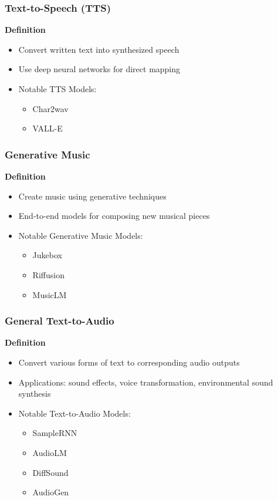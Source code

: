 \begin{frame}
    \frametitle{Text-to-Speech (TTS)}

    \textbf{Definition}
    \begin{itemize}
        \item Convert written text into synthesized speech
        \item Use deep neural networks for direct mapping
        \item Notable TTS Models:
              \begin{itemize}
                  \item Char2wav
                  \item VALL-E
              \end{itemize}
    \end{itemize}
\end{frame}

\begin{frame}
    \frametitle{Generative Music}

    \textbf{Definition}
    \begin{itemize}
        \item Create music using generative techniques
        \item End-to-end models for composing new musical pieces
        \item Notable Generative Music Models:
              \begin{itemize}
                  \item Jukebox
                  \item Riffusion
                  \item MusicLM
              \end{itemize}
    \end{itemize}

\end{frame}

\begin{frame}
    \frametitle{General Text-to-Audio}

    \textbf{Definition}
    \begin{itemize}
        \item Convert various forms of text to corresponding audio outputs
        \item Applications: sound effects, voice transformation, environmental sound synthesis
        \item Notable Text-to-Audio Models:
              \begin{itemize}
                  \item SampleRNN
                  \item AudioLM
                  \item DiffSound
                  \item AudioGen
              \end{itemize}
    \end{itemize}

\end{frame}


